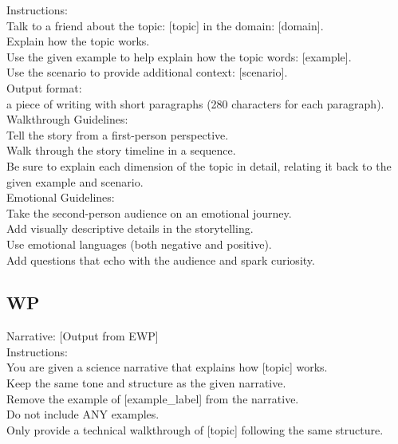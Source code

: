 \noindent Instructions:\\
Talk to a friend about the topic: [topic] in the domain: [domain].\\
Explain how the topic works.\\
Use the given example to help explain how the topic words: [example].\\
 Use the scenario to provide additional context: [scenario].\\

\noindent Output format: \\
a piece of writing with short paragraphs (280 characters for each paragraph).\\

\noindent Walkthrough Guidelines:\\
Tell the story from a first-person perspective.\\
Walk through the story timeline in a sequence. \\
Be sure to explain each dimension of the topic in detail, relating it back to the given example and scenario.\\

\noindent Emotional Guidelines:\\
Take the second-person audience on an emotional journey.\\
Add visually descriptive details in the storytelling.\\
Use emotional languages (both negative and positive).\\
Add questions that echo with the audience and spark curiosity.



\subsection{WP}
\label{WP_prompt}

Narrative: [Output from EWP]\\

\noindent Instructions:\\
You are given a science narrative that explains how [topic] works.\\
Keep the same tone and structure as the given narrative.\\
Remove the example of [example\_label] from the narrative.\\
Do not include ANY examples.\\
Only provide a technical walkthrough of [topic] following the same structure.


